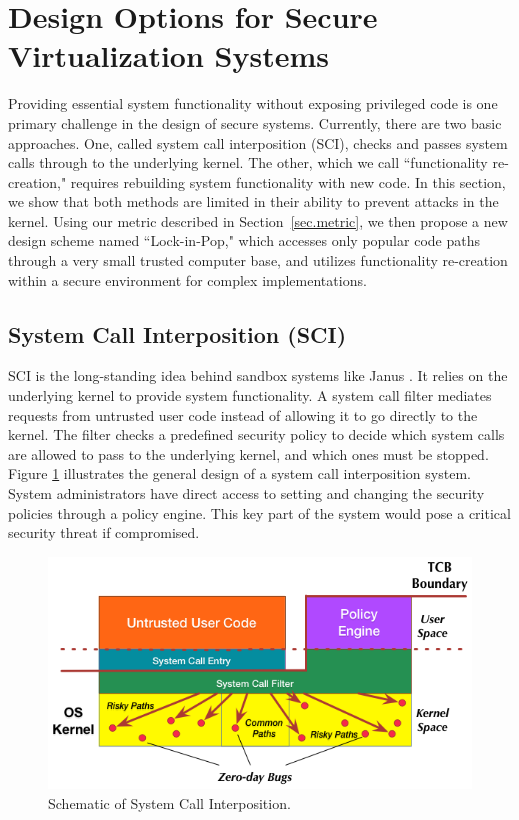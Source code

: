 \section{Design Options for Secure Virtualization Systems}
\label{sec.design}

Providing essential system functionality without exposing privileged code is one
primary challenge in the design of secure systems.
Currently, there are two basic approaches.
One, called system call interposition (SCI), checks and passes system calls
through to the underlying kernel. The other, which we call ``functionality
re-creation," requires rebuilding system functionality with new code. In this
section, we show that both methods are limited in their ability to
prevent attacks in the kernel.
Using our metric described in Section~\ref{sec.metric},
we then propose a new design scheme named ``Lock-in-Pop," which accesses only popular
 code paths through a very small trusted computer base, and utilizes
 functionality re-creation within a secure environment for complex implementations.

\subsection{System Call Interposition (SCI)}
SCI is the long-standing idea behind sandbox systems like Janus
\cite{Janus0:96, Janus:99}. It relies on the underlying kernel
to provide system functionality. A system call filter mediates requests
from untrusted user code instead of allowing it to go directly to the kernel.
The filter checks a predefined security policy to decide which system calls are
allowed to pass to the underlying kernel, and which ones must be stopped.
Figure \ref{fig:design_system_call_interposition} illustrates the general design
of a system call interposition system. System administrators have direct access to
setting and changing the security policies through a policy engine.
This key part of the system would pose a critical security threat if compromised.

\begin{figure}%
\centering
\includegraphics[width=1.0\columnwidth]{diagram/Virtualization_Design_Model_03.png}
\caption{\small Schematic of System Call Interposition.}
\label{fig:design_system_call_interposition}
\end{figure}

